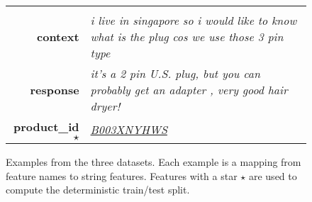 \documentclass[11pt,a4paper,table]{article}
\begin{document}
\begin{figure}[htb]
{\begin{tabular}{>{\bfseries}r >{\itshape}p{100mm}}
          
           \\
          context & i live in singapore so i would like to know what is the plug cos we use those 3 pin type \\
          response & it's a 2 pin U.S. plug, but you can probably get an adapter , very good hair dryer! \\[1ex]
          product\_id$\star$ & \href{https://www.amazon.com/ask/questions/asin/B003XNYHWS/1/ref=ask_ql_psf_ql_hza?sort=SUBMIT_DATE&isAnswered=true}{B003XNYHWS} \\
          
\end{tabular}
        \caption{Examples from the three datasets. Each example is a mapping from feature names to string features. Features with a star $\star$ are used to compute the deterministic train/test split.}
        \label{fig:examples}
    }
\end{figure}
\end{document}
